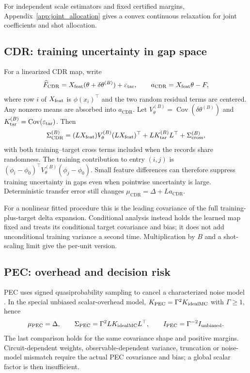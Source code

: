 \documentclass[a4paper,onecolumn,unpublished,nopdfoutputerror]{quantumarticle}
\theoremstyle{plain}
\theoremstyle{definition}
\newcommand{\Cov}{\operatorname{Cov}}
\newcommand{\CDR}{\mathrm{CDR}}
\newcommand{\PEC}{\mathrm{PEC}}
\newcommand{\1}{\mathbf{1}}
\begin{document}
For independent scale estimators and fixed certified margins, Appendix~\ref{app:joint_allocation} gives a convex continuous relaxation for joint coefficients and shot allocation.


\subsection{CDR: training uncertainty in gap space}
\label{sec:cdr_signature}
For a linearized CDR map, write
\[
\widehat F_{\CDR}=X_{\rm feat}(\theta+\delta\theta^{(B)})+\varepsilon_{\rm tar},
\qquad a_{\CDR}=X_{\rm feat}\theta-F,
\]
where row $i$ of $X_{\rm feat}$ is $\phi(x_i)^\top$ and the two random residual terms are centered. Any nonzero means are absorbed into $a_{\CDR}$. Let $V_\theta^{(B)}=\Cov(\delta\theta^{(B)})$ and $K_{\rm tar}^{(B)}=\Cov(\varepsilon_{\rm tar})$. Then
\begin{equation}
\Sigma_{\CDR}^{(B)}=(LX_{\rm feat})V_\theta^{(B)}(LX_{\rm feat})^\top
+LK_{\rm tar}^{(B)}L^\top+\Sigma_{\rm cross}^{(B)},
\end{equation}
with both training--target cross terms included when the records share randomness. The training contribution to entry $(i,j)$ is $(\phi_i-\phi_0)^\top V_\theta^{(B)}(\phi_j-\phi_0)$. Small feature differences can therefore suppress training uncertainty in gaps even when pointwise uncertainty is large. Deterministic transfer error still changes $\mu_{\CDR}=\Delta+La_{\CDR}$.

For a nonlinear fitted procedure this is the leading covariance of the full training-plus-target delta expansion. Conditional analysis instead holds the learned map fixed and treats its conditional target covariance and bias; it does not add unconditional training variance a second time. Multiplication by $B$ and a shot-scaling limit give the per-unit version.

\subsection{PEC: overhead and decision risk}
\label{sec:pec_signature}
PEC uses signed quasiprobability sampling to cancel a characterized noise model \cite{vandenBerg2023}. In the special unbiased scalar-overhead model, $K_{\PEC}=\Gamma^2K_{\rm idealMC}$ with $\Gamma\ge1$, hence
\begin{equation}
\mu_{\PEC}=\Delta,\qquad
\Sigma_{\PEC}=\Gamma^2LK_{\rm idealMC}L^\top,
\qquad I_{\PEC}=\Gamma^{-2}I_{\rm unbiased}.
\end{equation}
The last comparison holds for the same covariance shape and positive margins. Circuit-dependent weights, observable-dependent variance, truncation or noise-model mismatch require the actual PEC covariance and bias; a global scalar factor is then insufficient.
\end{document}
